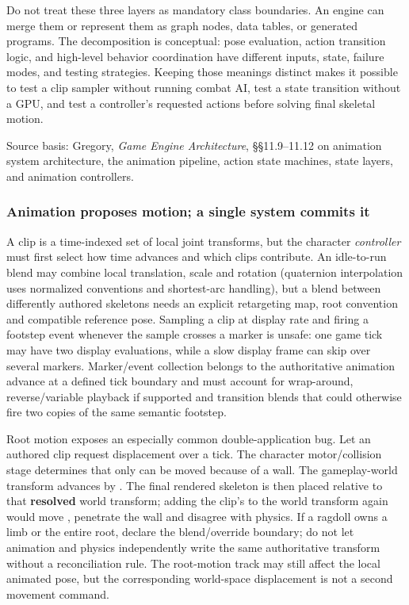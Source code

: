 Do not treat these three layers as mandatory class boundaries. An engine can merge them or represent them as graph nodes, data tables, or generated programs. The decomposition is conceptual: pose evaluation, action transition logic, and high-level behavior coordination have different inputs, state, failure modes, and testing strategies. Keeping those meanings distinct makes it possible to test a clip sampler without running combat AI, test a state transition without a GPU, and test a controller's requested actions before solving final skeletal motion.

Source basis: Gregory, \emph{Game Engine Architecture}, §§11.9--11.12 on animation system architecture, the animation pipeline, action state machines, state layers, and animation controllers.

\subsubsection{Animation proposes motion; a single system commits it}\label{06-engine-ii-ch040-animation-proposes-motion-a-single-system-commits-it}

\hypertarget{06-engine-ii-ch040-animation-proposes-motion-a-single-system-commits-it}{}

A clip is a time-indexed set of local joint transforms, but the character \emph{controller} must first select how time advances and which clips contribute. An idle-to-run blend may combine local translation, scale and rotation (quaternion interpolation uses normalized conventions and shortest-arc handling), but a blend between differently authored skeletons needs an explicit retargeting map, root convention and compatible reference pose. Sampling a clip at display rate and firing a footstep event whenever the sample crosses a marker is unsafe: one game tick may have two display evaluations, while a slow display frame can skip over several markers. Marker/event collection belongs to the authoritative animation advance at a defined tick boundary and must account for wrap-around, reverse/variable playback if supported and transition blends that could otherwise fire two copies of the same semantic footstep.

Root motion exposes an especially common double-application bug. Let an authored clip request displacement  over a tick. The character motor/collision stage determines that only  can be moved because of a wall. The gameplay-world transform advances by . The final rendered skeleton is then placed relative to that \textbf{resolved} world transform; adding the clip's  to the world transform again would move , penetrate the wall and disagree with physics. If a ragdoll owns a limb or the entire root, declare the blend/override boundary; do not let animation and physics independently write the same authoritative transform without a reconciliation rule. The root-motion track may still affect the local animated pose, but the corresponding world-space displacement is not a second movement command.


